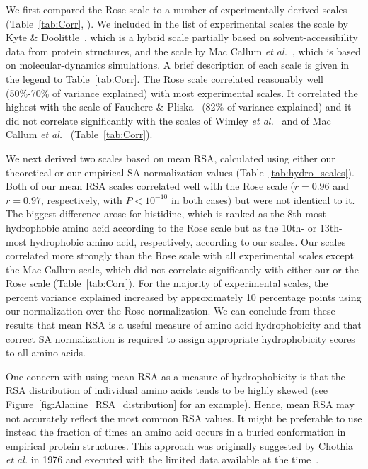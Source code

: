 \documentclass[11pt]{article}
\begin{document}
We first compared the Rose scale to a number of experimentally derived scales (Table~\ref{tab:Corr}, \cite{Wolfenden1981,Kyte1981,Fauchere1983,Radzicka1988,MacCallum2007,Moon2011,Wimley1996}). We included in the list of experimental scales the scale by Kyte \& Doolittle~\cite{Kyte1981}, which is a hybrid scale partially based on solvent-accessibility data from protein structures, and the scale by Mac Callum \emph{et al.}~\cite{MacCallum2007}, which is based on molecular-dynamics simulations. A brief description of each scale is given in the legend to Table~\ref{tab:Corr}. The Rose scale correlated reasonably well (50\%-70\% of variance explained) with most experimental scales. It correlated the highest with the scale of Fauchere \& Pliska~\cite{Fauchere1983} (82\% of variance explained) and it did not correlate significantly with the scales of Wimley \emph{et al.}~\cite{Wimley1996} and of Mac Callum \emph{et al.}~\cite{MacCallum2007} (Table~\ref{tab:Corr}).

We next derived two scales based on mean RSA, calculated using either our theoretical or our empirical SA normalization values (Table~\ref{tab:hydro_scales}). Both of our mean RSA scales correlated well with the Rose scale ($r=0.96$ and $r=0.97$, respectively, with $P<10^{-10}$ in both cases) but were not identical to it. The biggest difference arose for histidine, which is ranked as the 8th-most hydrophobic amino acid according to the Rose scale but as the 10th- or 13th-most hydrophobic amino acid, respectively, according to our scales. Our scales correlated more strongly than the Rose scale with all experimental scales except the Mac Callum scale, which did not correlate significantly with either our or the Rose scale (Table~\ref{tab:Corr}). For the majority of experimental scales, the percent variance explained increased by approximately 10 percentage points using our normalization over the Rose normalization. We can conclude from these results that mean RSA is a useful measure of amino acid hydrophobicity and that correct SA normalization is required to assign appropriate hydrophobicity scores to all amino acids.

One concern with using mean RSA as a measure of hydrophobicity is that the RSA distribution of individual amino acids tends to be highly skewed (see Figure~\ref{fig:Alanine_RSA_distribution} for an example). Hence, mean RSA may not accurately reflect the most common RSA values. It might be preferable to use instead the fraction of times an amino acid occurs in a buried conformation in empirical protein structures. This approach was originally suggested by Chothia \emph{et al.} in 1976 and executed with the limited data available at the time~\cite{Chothia1976}.
\end{document}
